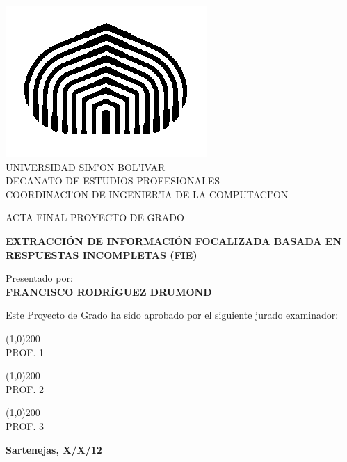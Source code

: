 \begin{titlepage}
\begin{center}

\includegraphics[scale=0.5,type=png,ext=.png,read=.png]{figures/cebolla} \\

\textsc {\large UNIVERSIDAD SIM'ON BOL'IVAR} \\
\textsc{DECANATO DE ESTUDIOS PROFESIONALES\\
COORDINACI'ON DE INGENIER'IA DE LA COMPUTACI'ON}

\bigskip
\bigskip
\bigskip
\bigskip
\bigskip
\bigskip

\textsc{ACTA FINAL PROYECTO DE GRADO}

\bigskip
\bigskip

\textsc{\bfseries  EXTRACCIÓN DE INFORMACIÓN FOCALIZADA BASADA EN RESPUESTAS INCOMPLETAS (FIE)}

\bigskip
\bigskip
\bigskip
\bigskip

\begin{minipage}{\textwidth}
\centering
Presentado por: \\
\textsc{\bfseries FRANCISCO RODRÍGUEZ DRUMOND} \\

\bigskip
\bigskip
\bigskip
\bigskip

Este Proyecto de Grado ha sido aprobado por el siguiente jurado examinador: \\

\bigskip
\bigskip

\line(1,0){200} \\
PROF. 1\\

\bigskip
\bigskip

\line(1,0){200} \\
PROF. 2\\

\bigskip
\bigskip

\line(1,0){200} \\
PROF. 3\\
\end{minipage}

\bigskip
\bigskip
\vfill

{\large \bfseries Sartenejas, X/X/12}

\end{center}
\end{titlepage}